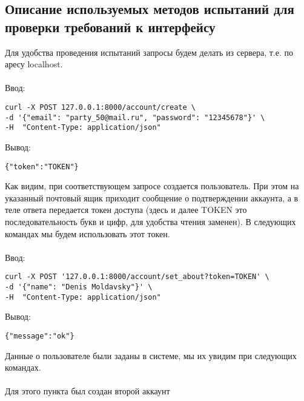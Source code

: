 \documentclass[testmethods]{espd}
\begin{document}
\subsection{Описание используемых методов испытаний для проверки требований к интерфейсу}
Для удобства проведения испытаний запросы будем делать из сервера, т.е. по аресу localhost.

\paragraph{} %
Ввод:

\begin{verbatim}
curl -X POST 127.0.0.1:8000/account/create \
-d '{"email": "party_50@mail.ru", "password": "12345678"}' \
-H  "Content-Type: application/json"
\end{verbatim}

Вывод:

\begin{verbatim}
{"token":"TOKEN"}
\end{verbatim}

Как видим, при соответствующем запросе создается пользователь. При этом на указанный почтовый ящик приходит сообщение о подтверждении аккаунта, а в теле ответа передается токен доступа (здесь и далее TOKEN это последовательность букв и цифр, для удобства чтения заменен). В следующих командах мы будем использовать этот токен.

\paragraph{} %
Ввод:

\begin{verbatim}
curl -X POST '127.0.0.1:8000/account/set_about?token=TOKEN' \
-d '{"name": "Denis Moldavsky"}' \
-H  "Content-Type: application/json"
\end{verbatim}

Вывод:

\begin{verbatim}
{"message":"ok"}
\end{verbatim}

Данные о пользователе были заданы в системе, мы их увидим при следующих командах.

\paragraph{} %
Для этого пункта был создан второй аккаунт
\end{document}

